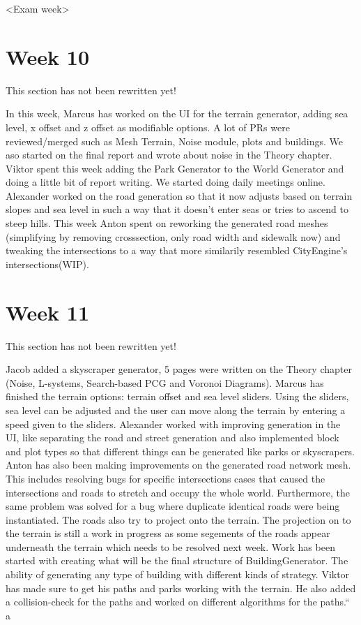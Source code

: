 \documentclass[11pt]{article}
\begin{document}
<Exam week>

\section*{Week 10}
\label{sec:org04203c6}
\begin{notice-warning}
This section has not been rewritten yet!
\end{notice-warning}

In this week, Marcus has worked on the UI for the terrain generator, adding sea
level, x offset and z offset as modifiable options. A lot of PRs were
reviewed/merged such as Mesh Terrain, Noise module, plots and buildings. We aso
started on the final report and wrote about noise in the Theory chapter. Viktor
spent this week adding the Park Generator to the World Generator and doing a
little bit of report writing. We started doing daily meetings online.
Alexander worked on the road generation so that it now adjusts based on terrain
slopes and sea level in such a way that it doesn't enter seas or tries to ascend
to steep hills. This week Anton spent on reworking the generated road meshes
(simplifying by removing crosssection, only road width and sidewalk now) and
tweaking the intersections to a way that more similarily resembled CityEngine's
intersections(WIP).

\section*{Week 11}
\label{sec:org234fee3}
\begin{notice-warning}
This section has not been rewritten yet!
\end{notice-warning}

Jacob added a skyscraper generator, 5 pages were written on the Theory chapter
(Noise, L-systems, Search-based PCG and Voronoi Diagrams). Marcus has finished
the terrain options: terrain offset and sea level sliders. Using the sliders,
sea level can be adjusted and the user can move along the terrain by entering a
speed given to the sliders.
Alexander worked with improving generation in the UI, like separating the road
and street generation and also implemented block and plot types so that
different things can be generated like parks or skyscrapers.
Anton has also been making improvements on the generated road network mesh. This
includes resolving bugs for specific intersections cases that caused the
intersections and roads to stretch and occupy the whole world. Furthermore, the
same problem was solved for a bug where duplicate identical roads were being
instantiated. The roads also try to project onto the terrain. The projection on
to the terrain is still a work in progress as some segements of the roads appear
underneath the terrain which needs to be resolved next week.
Work has been started with creating what will be the final structure of
BuildingGenerator. The ability of generating any type of building with different
kinds of strategy. Viktor has made sure to get his paths and parks working with
the terrain. He also added a collision-check for the paths and worked on
different algorithms for the paths.``
a




\label{orgc70132d}


\label{orga8bc053}

\end{document}
